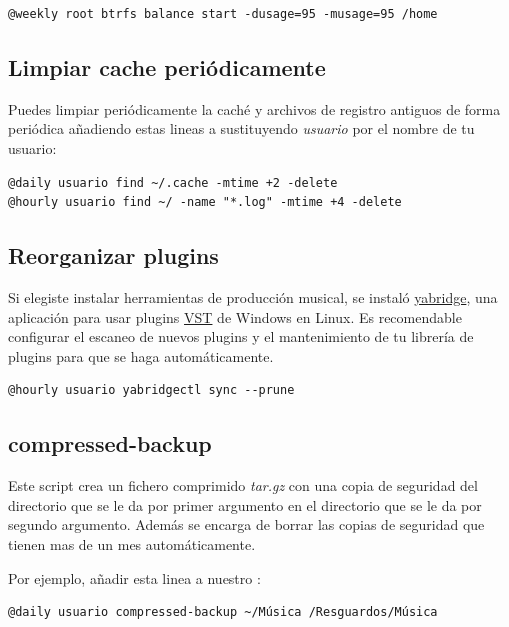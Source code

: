 \documentclass[11pt]{article}
\begin{document}
\begin{verbatim}
@weekly root btrfs balance start -dusage=95 -musage=95 /home
\end{verbatim}

\subsection{Limpiar cache periódicamente}

Puedes limpiar periódicamente la caché y archivos de registro antiguos de forma periódica añadiendo estas lineas a  sustituyendo \textit{usuario} por el nombre de tu usuario:

\begin{verbatim}
@daily usuario find ~/.cache -mtime +2 -delete
@hourly usuario find ~/ -name "*.log" -mtime +4 -delete
\end{verbatim}

\subsection{Reorganizar plugins}

Si elegiste instalar herramientas de producción musical, se instaló \href{https://github.com/robbert-vdh/yabridge}{yabridge}, una aplicación para usar plugins \href{https://es.wikipedia.org/wiki/Virtual_Studio_Technology}{VST} de Windows en Linux. Es recomendable configurar el escaneo de nuevos plugins y el mantenimiento de tu librería de plugins para que se haga automáticamente.

\begin{verbatim}
@hourly usuario yabridgectl sync --prune
\end{verbatim}

\subsection{compressed-backup}

Este script crea un fichero comprimido \textit{tar.gz} con una copia de seguridad del directorio que se le da por primer argumento en el directorio que se le da por segundo argumento. Además se encarga de borrar las copias de seguridad que tienen mas de un mes automáticamente.

\vspace{5pt}

\noindent Por ejemplo, añadir esta linea a nuestro :

\begin{verbatim}
@daily usuario compressed-backup ~/Música /Resguardos/Música
\end{verbatim}
\end{document}
